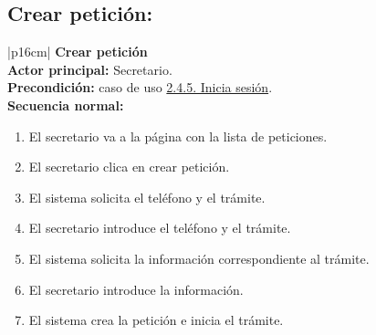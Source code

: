     \subsection{Crear petición:}
        \begin{longtable}{|p{16cm}|} 
        \hline
        \textbf{Crear petición} \\ \hline
        \textbf{Actor principal:} Secretario. \\ \hline
        \textbf{Precondición:} caso de uso \hyperref[subsec:2.4.5.]{2.4.5. Inicia sesión}. \\ \hline
        \textbf{Secuencia normal:} \\
        \begin{minipage}[t]{\linewidth}
            \begin{enumerate}
                \item El secretario va a la página con la lista de peticiones.
                \item El secretario clica en crear petición.
                \item El sistema solicita el teléfono y el trámite.
                \item El secretario introduce el teléfono y el trámite.
                \item El sistema solicita la información correspondiente al trámite.
                \item El secretario introduce la información.
                \item El sistema crea la petición e inicia el trámite.
            \end{enumerate}
            \vspace{1mm}
        \end{minipage} \\ \hline
        \caption{Descripción general del caso de uso - Crear petición.}
        \end{longtable}

